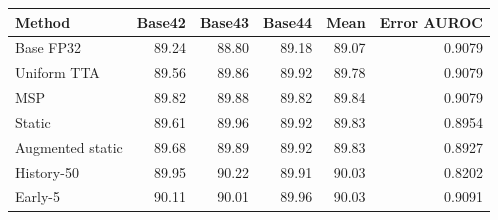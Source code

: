 \begin{tabular}{lrrrrr}
\toprule
Method & Base42 & Base43 & Base44 & Mean & Error AUROC \\
\midrule
Base FP32 & 89.24 & 88.80 & 89.18 & 89.07 & 0.9079 \\
Uniform TTA & 89.56 & 89.86 & 89.92 & 89.78 & 0.9079 \\
MSP & 89.82 & 89.88 & 89.82 & 89.84 & 0.9079 \\
Static & 89.61 & 89.96 & 89.92 & 89.83 & 0.8954 \\
Augmented static & 89.68 & 89.89 & 89.92 & 89.83 & 0.8927 \\
History-50 & 89.95 & 90.22 & 89.91 & 90.03 & 0.8202 \\
Early-5 & 90.11 & 90.01 & 89.96 & 90.03 & 0.9091 \\
\bottomrule
\end{tabular}
